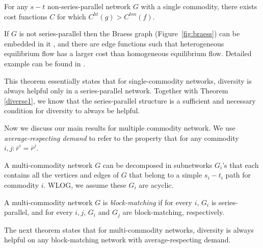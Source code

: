 \begin{theorem}
For any $s-t$ non-series-parallel network $G$ with a single commodity, there exists cost functions $C$ for which $C^{ht}(g)> C^{hm}(f)$.
\label{diversethm2}
\end{theorem}

\begin{proof-sketch}
    If $G$ is not series-parallel then the Braess graph (Figure~\ref{fig:braess}) can be embedded in it \cite{Valdes:1979:RSP:800135.804393} , and there are edge functions such that heterogeneous equilibrium flow has a larger cost than homogeneous equilibrium flow. Detailed example can be found in \cite{ijcai2018-24}.
\end{proof-sketch}

This theorem essentially states that for single-commodity networks, diversity is always helpful only in a series-parallel network. Together with Theorem \ref{diverse1}, we know that the series-parallel structure is a sufficient and necessary condition for diversity to always be helpful.

Now we discuss our main results for multiple commodity network. We use {\it average-respecting demand} to refer to the property that for any commodity $i,j: \bar{r}^i=\bar{r}^j$. 

A multi-commodity network $G$ can be decomposed in subnetworks $G_i$'s that each contains all the vertices and edges of $G$ that belong to a simple $s_i-t_i$ path for commodity $i$. WLOG, we assume these $G_i$ are acyclic.

\begin{definition}
    A multi-commodity network $G$ is {\it block-matching} if for every $i$, $G_i$ is series-parallel, and for every $i, j$, $G_i$ and $G_j$ are block-matching, respectively. 
\end{definition}

The next theorem states that for multi-commodity networks, diversity is always helpful on any block-matching network with average-respecting demand. 

